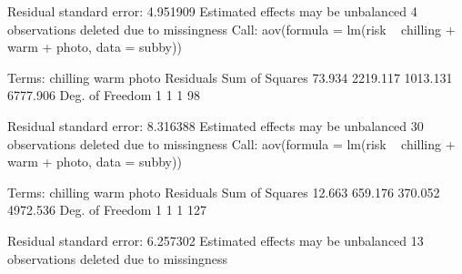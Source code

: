 \documentclass{article}\usepackage[]{graphicx}\usepackage[]{color}
\begin{document}
Residual standard error: 4.951909
Estimated effects may be unbalanced
4 observations deleted due to missingness
Call:
   aov(formula = lm(risk ~ chilling + warm + photo, data = subby))

Terms:
                chilling     warm    photo Residuals
Sum of Squares    73.934 2219.117 1013.131  6777.906
Deg. of Freedom        1        1        1        98

Residual standard error: 8.316388
Estimated effects may be unbalanced
30 observations deleted due to missingness
Call:
   aov(formula = lm(risk ~ chilling + warm + photo, data = subby))

Terms:
                chilling     warm    photo Residuals
Sum of Squares    12.663  659.176  370.052  4972.536
Deg. of Freedom        1        1        1       127

Residual standard error: 6.257302
Estimated effects may be unbalanced
13 observations deleted due to missingness

\end{document}
